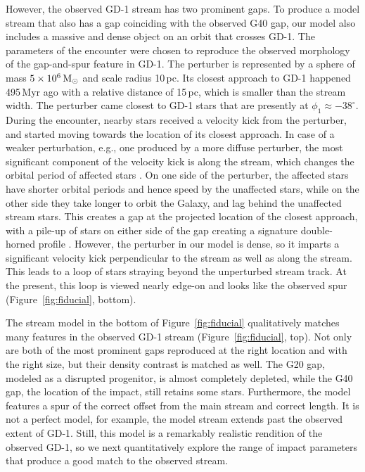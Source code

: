 \documentclass[twocolumn]{aastex62}
\begin{document}
However, the observed GD-1 stream has two prominent gaps.
To produce a model stream that also has a gap coinciding with the observed G40 gap, our model also includes a massive and dense object on an orbit that crosses GD-1.
The parameters of the encounter were chosen to reproduce the observed morphology of the gap-and-spur feature in GD-1.
The perturber is represented by a \citet{hernquist1990} sphere of mass $5\times10^6\rm\,M_\odot$ and scale radius 10\,pc.
Its closest approach to GD-1 happened 495\,Myr ago with a relative distance of 15\,pc, which is smaller than the stream width.
The perturber came closest to GD-1 stars that are presently at $\phi_1\approx-38^\circ$.
During the encounter, nearby stars received a velocity kick from the perturber, and started moving towards the location of its closest approach.
In case of a weaker perturbation, e.g., one produced by a more diffuse perturber, the most significant component of the velocity kick is along the stream, which changes the orbital period of affected stars \citep{eb2015}.
On one side of the perturber, the affected stars have shorter orbital periods and hence speed by the unaffected stars, while on the other side they take longer to orbit the Galaxy, and lag behind the unaffected stream stars.
This creates a gap at the projected location of the closest approach, with a pile-up of stars on either side of the gap creating a signature double-horned profile \citep{carlberg2012}.
However, the perturber in our model is dense, so it imparts a significant velocity kick perpendicular to the stream as well as along the stream.
This leads to a loop of stars straying beyond the unperturbed stream track.
At the present, this loop is viewed nearly edge-on and looks like the observed spur (Figure~\ref{fig:fiducial}, bottom).

The stream model in the bottom of Figure~\ref{fig:fiducial} qualitatively matches many features in the observed GD-1 stream (Figure~\ref{fig:fiducial}, top).
Not only are both of the most prominent gaps reproduced at the right location and with the right size, but their density contrast is matched as well.
The G20 gap, modeled as a disrupted progenitor, is almost completely depleted, while the G40 gap, the location of the impact, still retains some stars.
Furthermore, the model features a spur of the correct offset from the main stream and correct length.
It is not a perfect model, for example, the model stream extends past the observed extent of GD-1.
Still, this model is a remarkably realistic rendition of the observed GD-1, so we next quantitatively explore the range of impact parameters that produce a good match to the observed stream.
\end{document}
